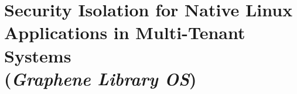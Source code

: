 
\chapter{Security Isolation for Native Linux Applications in Multi-Tenant Systems \\ ({\em Graphene Library OS})}









